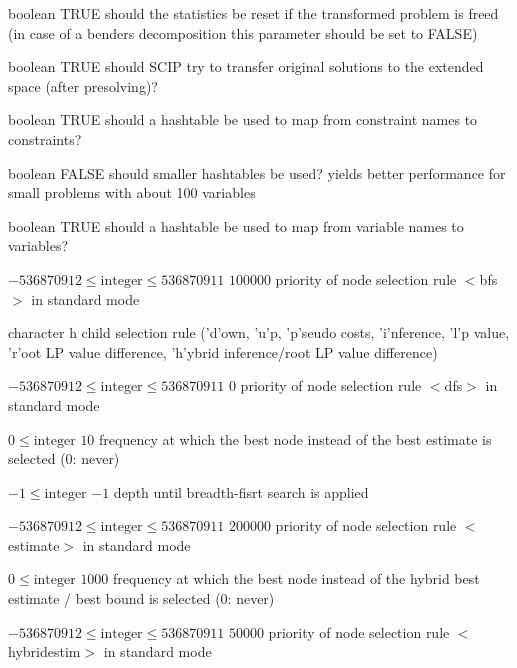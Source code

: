 %
{boolean}%
{TRUE}%
{should the statistics be reset if the transformed problem is freed (in case of a benders decomposition this parameter should be set to FALSE)}%
{}

%
{boolean}%
{TRUE}%
{should SCIP try to transfer original solutions to the extended space (after presolving)?}%
{}

%
{boolean}%
{TRUE}%
{should a hashtable be used to map from constraint names to constraints?}%
{}

%
{boolean}%
{FALSE}%
{should smaller hashtables be used? yields better performance for small problems with about 100 variables}%
{}

%
{boolean}%
{TRUE}%
{should a hashtable be used to map from variable names to variables?}%
{}

%
{$-536870912\leq\textrm{integer}\leq536870911$}%
{$100000$}%
{priority of node selection rule $<$bfs$>$ in standard mode}%
{}

%
{character}%
{h}%
{child selection rule ('d'own, 'u'p, 'p'seudo costs, 'i'nference, 'l'p value, 'r'oot LP value difference, 'h'ybrid inference/root LP value difference)}%
{}

%
{$-536870912\leq\textrm{integer}\leq536870911$}%
{$0$}%
{priority of node selection rule $<$dfs$>$ in standard mode}%
{}

%
{$0\leq\textrm{integer}$}%
{$10$}%
{frequency at which the best node instead of the best estimate is selected (0: never)}%
{}

%
{$-1\leq\textrm{integer}$}%
{$-1$}%
{depth until breadth-fisrt search is applied}%
{}

%
{$-536870912\leq\textrm{integer}\leq536870911$}%
{$200000$}%
{priority of node selection rule $<$estimate$>$ in standard mode}%
{}

%
{$0\leq\textrm{integer}$}%
{$1000$}%
{frequency at which the best node instead of the hybrid best estimate / best bound is selected (0: never)}%
{}

%
{$-536870912\leq\textrm{integer}\leq536870911$}%
{$50000$}%
{priority of node selection rule $<$hybridestim$>$ in standard mode}%
{}

